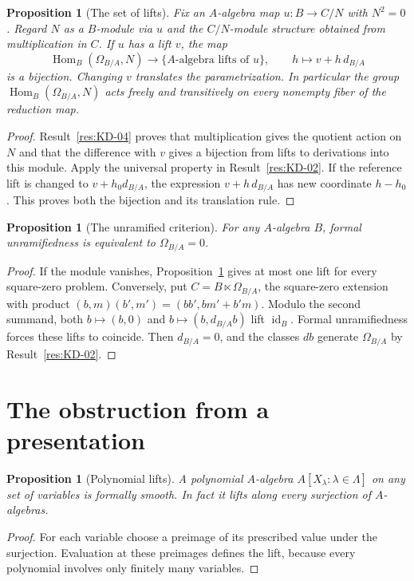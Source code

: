 \documentclass[11pt,oneside,openany]{book}
\newtheorem{proposition}[theorem]{Proposition}
\theoremstyle{definition}
\theoremstyle{remark}
\begin{document}
\begin{proposition}[The set of lifts]\label{res:FL-03}
Fix an $A$-algebra map $u:B\to C/N$ with $N^2=0$. Regard $N$ as a
$B$-module via $u$ and the $C/N$-module structure obtained from multiplication
in $C$. If $u$ has a lift $v$, the map
\[
  \operatorname{Hom}_B(\Omega_{B/A},N)\longrightarrow
  \{\text{$A$-algebra lifts of }u\},\qquad h\longmapsto v+h\,d_{B/A}
\]
is a bijection. Changing $v$ translates the parametrization. In particular the
group $\operatorname{Hom}_B(\Omega_{B/A},N)$ acts freely and transitively on
every nonempty fiber of the reduction map.
\end{proposition}
\begin{proof}
Result~\ref{res:KD-04} proves that multiplication gives the quotient action
on $N$ and that the difference with $v$ gives a bijection from lifts to
derivations into this module. Apply the universal property
in Result~\ref{res:KD-02}. If the reference lift is changed to
$v+h_0d_{B/A}$, the expression $v+h\,d_{B/A}$ has new coordinate $h-h_0$.
This proves both the bijection and its translation rule.
\end{proof}

\begin{proposition}[The unramified criterion]\label{res:FL-04}
For any $A$-algebra $B$, formal unramifiedness is equivalent to
$\Omega_{B/A}=0$.
\end{proposition}
\begin{proof}
If the module vanishes, Proposition~\ref{res:FL-03} gives at most one lift for
every square-zero problem. Conversely, put $C=B\ltimes\Omega_{B/A}$, the
square-zero extension with product $(b,m)(b',m')=(bb',bm'+b'm)$.
Modulo the second summand, both $b\mapsto(b,0)$ and
$b\mapsto(b,d_{B/A}b)$ lift $\operatorname{id}_B$. Formal unramifiedness forces
these lifts to coincide. Then $d_{B/A}=0$, and the classes $db$
generate $\Omega_{B/A}$ by Result~\ref{res:KD-02}.
\end{proof}

\section{The obstruction from a presentation}

\begin{proposition}[Polynomial lifts]\label{res:FL-05}
A polynomial $A$-algebra $A[X_\lambda:\lambda\in\Lambda]$ on any set of
variables is formally smooth. In fact it lifts along every surjection of
$A$-algebras.
\end{proposition}
\begin{proof}
For each variable choose a preimage of its prescribed value under the
surjection. Evaluation at these preimages defines the lift, because every
polynomial involves only finitely many variables.
\end{proof}
\end{document}

